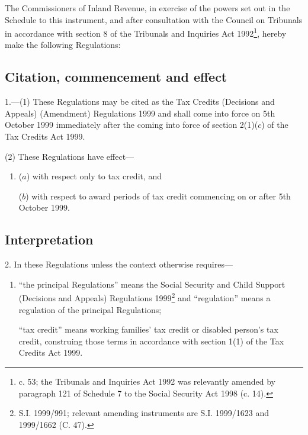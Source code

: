 \documentclass[12pt,a4paper]{article}
\title{\regstitle}
\author{S.I. 1999 No. 2570}
\date{Made
14th September 1999\\
Laid before Parliament
14th September 1999\\
Coming into force
5th October 1999
}
\begin{document}
\maketitle

\noindent
The Commissioners of Inland Revenue, in exercise of the powers set out in the Schedule to this instrument, and after consultation with the Council on Tribunals in accordance with section 8 of the Tribunals and Inquiries Act 1992\footnote{ c. 53; the Tribunals and Inquiries Act 1992 was relevantly amended by paragraph 121 of Schedule 7 to the Social Security Act 1998 (c. 14).}, hereby make the following Regulations: 

{\sloppy

\tableofcontents

}

\bigskip

\setcounter{secnumdepth}{-2}

\subsection[1. Citation, commencement and effect]{Citation, commencement and effect}

1.---(1)  These Regulations may be cited as the Tax Credits (Decisions and Appeals) (Amendment) Regulations 1999 and shall come into force on 5th October 1999 immediately after the coming into force of section 2(1)($c$)  of the Tax Credits Act 1999.

(2) These Regulations have effect—
\begin{enumerate}\item[]
($a$) with respect only to tax credit, and

($b$) with respect to award periods of tax credit commencing on or after 5th October 1999.
\end{enumerate}

\subsection[2. Interpretation]{Interpretation}

2.  In these Regulations unless the context otherwise requires—
\begin{enumerate}\item[]
“the principal Regulations” means the Social Security and Child Support (Decisions and Appeals) Regulations 1999\footnote{\frenchspacing S.I. 1999/991; relevant amending instruments are S.I. 1999/1623 and 1999/1662 (C. 47).} and “regulation” means a regulation of the principal Regulations;

“tax credit” means working families' tax credit or disabled person’s tax credit, construing those terms in accordance with section 1(1) of the Tax Credits Act 1999.
\end{enumerate}
\end{document}
